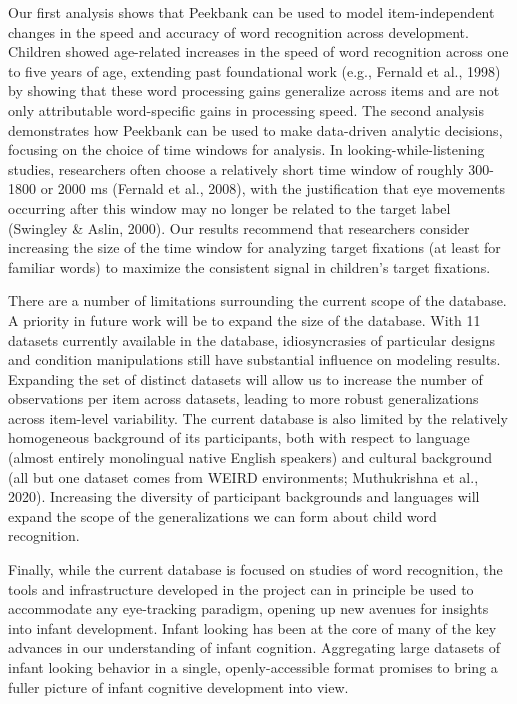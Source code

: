 \documentclass[10pt, letterpaper]{article}
\begin{document}
Our first analysis shows that Peekbank can be used to model
item-independent changes in the speed and accuracy of word recognition
across development. Children showed age-related increases in the speed
of word recognition across one to five years of age, extending past
foundational work (e.g., Fernald et al., 1998) by showing that these
word processing gains generalize across items and are not only
attributable word-specific gains in processing speed. The second
analysis demonstrates how Peekbank can be used to make data-driven
analytic decisions, focusing on the choice of time windows for analysis.
In looking-while-listening studies, researchers often choose a
relatively short time window of roughly 300-1800 or 2000 ms (Fernald et
al., 2008), with the justification that eye movements occurring after
this window may no longer be related to the target label (Swingley \&
Aslin, 2000). Our results recommend that researchers consider increasing
the size of the time window for analyzing target fixations (at least for
familiar words) to maximize the consistent signal in children's target
fixations.

There are a number of limitations surrounding the current scope of the
database. A priority in future work will be to expand the size of the
database. With 11 datasets currently available in the database,
idiosyncrasies of particular designs and condition manipulations still
have substantial influence on modeling results. Expanding the set of
distinct datasets will allow us to increase the number of observations
per item across datasets, leading to more robust generalizations across
item-level variability. The current database is also limited by the
relatively homogeneous background of its participants, both with respect
to language (almost entirely monolingual native English speakers) and
cultural background (all but one dataset comes from WEIRD environments;
Muthukrishna et al., 2020). Increasing the diversity of participant
backgrounds and languages will expand the scope of the generalizations
we can form about child word recognition.

Finally, while the current database is focused on studies of word
recognition, the tools and infrastructure developed in the project can
in principle be used to accommodate any eye-tracking paradigm, opening
up new avenues for insights into infant development. Infant looking has
been at the core of many of the key advances in our understanding of
infant cognition. Aggregating large datasets of infant looking behavior
in a single, openly-accessible format promises to bring a fuller picture
of infant cognitive development into view.
\end{document}
